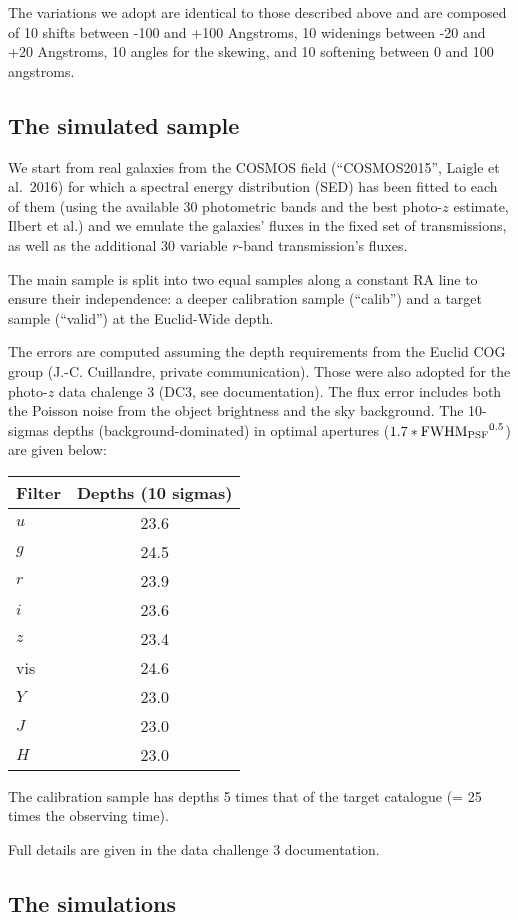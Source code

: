 \documentclass{article}
\begin{document}
The variations we adopt are identical to those described above and are
composed of 10 shifts between -100 and +100 Angstroms, 10 widenings
between -20 and +20 Angstroms, 10 angles for the skewing, and 10
softening between 0 and 100 angstroms.


    \hypertarget{the-simulated-sample}{%
\subsection{The simulated sample}\label{the-simulated-sample}}

We start from real galaxies from the COSMOS field (``COSMOS2015'',
Laigle et al.~2016) for which a spectral energy distribution (SED) has
been fitted to each of them (using the available 30 photometric bands
and the best photo-\(z\) estimate, Ilbert et al.) and we emulate the
galaxies' fluxes in the fixed set of transmissions, as well as the
additional 30 variable \(r\)-band transmission's fluxes.

The main sample is split into two equal samples along a constant RA line
to ensure their independence: a deeper calibration sample (``calib'')
and a target sample (``valid'') at the Euclid-Wide depth.




    The errors are computed assuming the depth requirements from the Euclid
COG group (J.-C. Cuillandre, private communication). Those were also
adopted for the photo-\(z\) data chalenge 3 (DC3, see documentation).
The flux error includes both the Poisson noise from the object
brightness and the sky background. The 10-sigmas depths
(background-dominated) in optimal apertures
(\(1.7*{{\rm FWHM}_{\rm PSF}}^{0.5}\)) are given below:

\begin{longtable}[]{@{}lc@{}}
\toprule
Filter & Depths (10 sigmas)\tabularnewline
\midrule
\endhead
\(u\) & 23.6\tabularnewline
\(g\) & 24.5\tabularnewline
\(r\) & 23.9\tabularnewline
\(i\) & 23.6\tabularnewline
\(z\) & 23.4\tabularnewline
vis & 24.6\tabularnewline
\(Y\) & 23.0\tabularnewline
\(J\) & 23.0\tabularnewline
\(H\) & 23.0\tabularnewline
\bottomrule
\end{longtable}

The calibration sample has depths 5 times that of the target catalogue
(= 25 times the observing time).

Full details are given in the data challenge 3 documentation.




    \hypertarget{the-simulations}{%
\subsection{The simulations}\label{the-simulations}}
\end{document}
